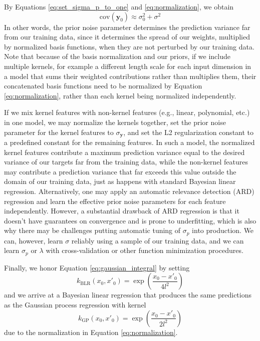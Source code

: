 \documentclass{article}
\begin{document}
By Equations \ref{eq:set_sigma_p_to_one} and \ref{eq:normalization}, we obtain 
\begin{equation}
\text{cov}(\mathbf{y}_0)\approx\sigma_0^2 + \sigma^2
\end{equation}In other words, the prior noise parameter determines the prediction variance far from our training data, since it determines the spread of our weights, multiplied by normalized basis functions, when they are not perturbed by our training data. Note that because of the basis normalization and our priors, if we include multiple kernels, for example a different length scale for each input dimension in a model that sums their weighted contributions rather than multiplies them, their concatenated basis functions need to be normalized by Equation \ref{eq:normalization}, rather than each kernel being normalized independently. 

If we mix kernel features with non-kernel features (e.g., linear, polynomial, etc.) in one model, we may normalize the kernels together, set the prior noise parameter for the kernel features to $\sigma_\mathbf{y}$, and set the L2 regularization constant to a predefined constant for the remaining features. In such a model, the normalized kernel features contribute a maximum prediction variance equal to the desired variance of our targets far from the training data, while the non-kernel features may contribute a prediction variance that far exceeds this value outside the domain of our training data, just as happens with standard Bayesian linear regression. Alternatively, one may apply an automatic relevance detection (ARD) regression and learn the effective prior noise parameters for each feature independently. However, a substantial drawback of ARD regression is that it doesn't have guarantees on convergence and is prone to underfitting, which is also why there may be challenges putting automatic tuning of $\sigma_p$ into production. We can, however,  learn $\sigma$ reliably using a sample of our training data, and we can learn $\sigma_p$ or $\lambda$ with cross-validation or other function minimization procedures.

Finally, we honor Equation \ref{eq:gaussian_integral} by setting
\begin{equation}
    k_\text{BLR}(x_0,x'_0)=\exp\left(\frac{x_0-x'_0}{4l^2}\right)
\end{equation}and we arrive at a Bayesian linear regression that produces the same predictions as the Gaussian process regression with kernel
\begin{equation}
    k_\text{GP}(x_0,x'_0)=\exp\left(\frac{x_0-x'_0}{2l^2}\right)
\end{equation} due to the normalization in Equation \ref{eq:normalization}.
\end{document}
